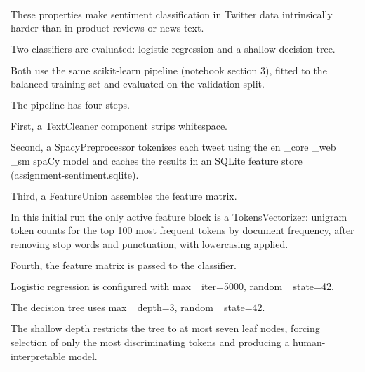 \documentclass[11pt]{article}
\begin{document}
\begin{longtable}{|p{\dimexpr\linewidth-2\tabcolsep-2\arrayrulewidth\relax}|}
\hline
\rule{0pt}{3.5cm} \\
\hline
These properties make sentiment classification in Twitter data intrinsically harder than in product reviews or news text. \\[2pt]
\hline
\rule{0pt}{3.5cm} \\
\hline
Two classifiers are evaluated: logistic regression and a shallow decision tree. \\[2pt]
\hline
\rule{0pt}{3.5cm} \\
\hline
Both use the same scikit-learn pipeline (notebook section 3), fitted to the balanced training set and evaluated on the validation split. \\[2pt]
\hline
\rule{0pt}{3.5cm} \\
\hline
The pipeline has four steps. \\[2pt]
\hline
\rule{0pt}{3.5cm} \\
\hline
First, a TextCleaner component strips whitespace. \\[2pt]
\hline
\rule{0pt}{3.5cm} \\
\hline
Second, a SpacyPreprocessor tokenises each tweet using the en \_core \_web \_sm spaCy model and caches the results in an SQLite feature store (assignment-sentiment.sqlite). \\[2pt]
\hline
\rule{0pt}{3.5cm} \\
\hline
Third, a FeatureUnion assembles the feature matrix. \\[2pt]
\hline
\rule{0pt}{3.5cm} \\
\hline
In this initial run the only active feature block is a TokensVectorizer: unigram token counts for the top 100 most frequent tokens by document frequency, after removing stop words and punctuation, with lowercasing applied. \\[2pt]
\hline
\rule{0pt}{3.5cm} \\
\hline
Fourth, the feature matrix is passed to the classifier. \\[2pt]
\hline
\rule{0pt}{3.5cm} \\
\hline
Logistic regression is configured with max \_iter=5000, random \_state=42. \\[2pt]
\hline
\rule{0pt}{3.5cm} \\
\hline
The decision tree uses max \_depth=3, random \_state=42. \\[2pt]
\hline
\rule{0pt}{3.5cm} \\
\hline
The shallow depth restricts the tree to at most seven leaf nodes, forcing selection of only the most discriminating tokens and producing a human-interpretable model. \\[2pt]

\end{longtable}
\end{document}
